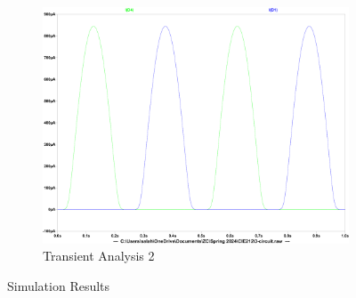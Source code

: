\documentclass{zc-ust-hw}
\begin{document}
\begin{enumerate}
\begin{figure}[H]
\begin{subfigure}{0.45\textwidth}
        \centering
        \includegraphics[width=\textwidth]{figures/3-transient-2.pdf}
        \caption{Transient Analysis 2}
      \end{subfigure}
      \caption{Simulation Results}
    \end{figure}

\end{enumerate}
\end{document}

